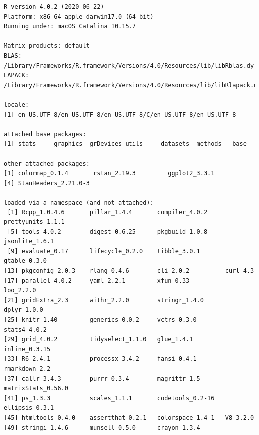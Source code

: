 \documentclass[
  letterpaper,
  DIV=11,
  numbers=noendperiod]{scrartcl}
\begin{document}
\begin{verbatim}
R version 4.0.2 (2020-06-22)
Platform: x86_64-apple-darwin17.0 (64-bit)
Running under: macOS Catalina 10.15.7

Matrix products: default
BLAS:   /Library/Frameworks/R.framework/Versions/4.0/Resources/lib/libRblas.dylib
LAPACK: /Library/Frameworks/R.framework/Versions/4.0/Resources/lib/libRlapack.dylib

locale:
[1] en_US.UTF-8/en_US.UTF-8/en_US.UTF-8/C/en_US.UTF-8/en_US.UTF-8

attached base packages:
[1] stats     graphics  grDevices utils     datasets  methods   base     

other attached packages:
[1] colormap_0.1.4       rstan_2.19.3         ggplot2_3.3.1       
[4] StanHeaders_2.21.0-3

loaded via a namespace (and not attached):
 [1] Rcpp_1.0.4.6       pillar_1.4.4       compiler_4.0.2     prettyunits_1.1.1 
 [5] tools_4.0.2        digest_0.6.25      pkgbuild_1.0.8     jsonlite_1.6.1    
 [9] evaluate_0.17      lifecycle_0.2.0    tibble_3.0.1       gtable_0.3.0      
[13] pkgconfig_2.0.3    rlang_0.4.6        cli_2.0.2          curl_4.3          
[17] parallel_4.0.2     yaml_2.2.1         xfun_0.33          loo_2.2.0         
[21] gridExtra_2.3      withr_2.2.0        stringr_1.4.0      dplyr_1.0.0       
[25] knitr_1.40         generics_0.0.2     vctrs_0.3.0        stats4_4.0.2      
[29] grid_4.0.2         tidyselect_1.1.0   glue_1.4.1         inline_0.3.15     
[33] R6_2.4.1           processx_3.4.2     fansi_0.4.1        rmarkdown_2.2     
[37] callr_3.4.3        purrr_0.3.4        magrittr_1.5       matrixStats_0.56.0
[41] ps_1.3.3           scales_1.1.1       codetools_0.2-16   ellipsis_0.3.1    
[45] htmltools_0.4.0    assertthat_0.2.1   colorspace_1.4-1   V8_3.2.0          
[49] stringi_1.4.6      munsell_0.5.0      crayon_1.3.4      
\end{verbatim}
\end{document}
